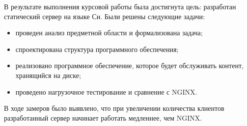 \Conclusion 

В результате выполнения курсовой работы была достигнута цель: разработан статический сервер на языке Си. Были решены следующие задачи:

\begin{itemize}
	\item проведен анализ предметной области и формализована задача;
	\item спроектирована структура программного обеспечения;
	\item реализовано программное обеспечение, которое будет обслуживать контент, хранящийся на диске;
	\item проведено нагрузочное тестирование и сравнение с NGINX.
\end{itemize}

В ходе замеров было выявлено, что при увеличении количества клиентов разработанный сервер начинает работать медленнее, чем NGINX.